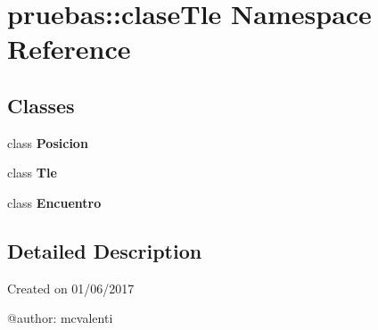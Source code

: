 \section{pruebas\-:\-:clase\-Tle \-Namespace \-Reference}
\label{namespacepruebas_1_1clase_tle}
\subsection*{\-Classes}
\begin{DoxyCompactItemize}
\item 
class {\bf \-Posicion}
\item 
class {\bf \-Tle}
\item 
class {\bf \-Encuentro}
\end{DoxyCompactItemize}


\subsection{\-Detailed \-Description}
\begin{DoxyVerb}
Created on 01/06/2017

@author: mcvalenti
\end{DoxyVerb}
 
